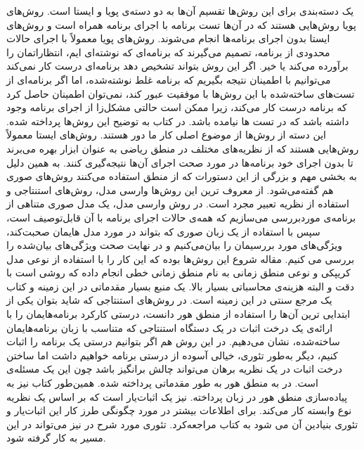 \documentclass[12pt]{report}
\begin{document}
یک دسته‌بندی برای این روش‌ها تقسیم آن‌ها به دو دسته‌ی پویا و ایستا است. روش‌های پویا روش‌هایی هستند که در آن‌ها تست برنامه با اجرای برنامه همراه است و روش‌های ایستا بدون اجرای برنامه‌ها انجام می‌شوند.
روش‌های پویا معمولاً با اجرای حالات محدودی از برنامه، تصمیم می‌گیرند که برنامه‌ای که نوشته‌ای ایم، انتظاراتمان را برآورده می‌کند یا خیر. اگر این روش بتواند تشخیص دهد برنامه‌ای درست کار نمی‌کند می‌توانیم با اطمینان نتیجه بگیریم که برنامه غلط نوشته‌شده، اما اگر برنامه‌ای از تست‌های ساخته‌شده با این روش‌ها با موفقیت عبور کند، نمی‌توان اطمینان حاصل کرد که برنامه درست کار می‌کند، زیرا ممکن است حالتی مشکل‌زا از اجرای برنامه وجود داشته باشد که در تست ها نیامده باشد. در  کتاب \cite{art}  به توضیح این روش‌ها پرداخته شده. این دسته از روش‌ها از موضوع اصلی کار ما دور هستند.
روش‌های ایستا معمولاً روش‌هایی هستند که از نظریه‌های مختلف در منطق ریاضی به عنوان ابزار بهره می‌برند تا بدون اجرای خود برنامه‌ها در مورد صحت اجرای آن‌ها نتیجه‌گیری کنند. به همین دلیل به بخشی مهم و بزرگی از این دستورات که از منطق استفاده می‌کنند روش‌های صوری هم گفته‌می‌شود. از معروف ترین این روش‌ها وارسی‌ مدل، روش‌های استنتاجی و استفاده از نظریه تعبیر مجرد است.
در روش وارسی مدل، یک مدل صوری متناهی از برنامه‌ی موردبررسی می‌سازیم که  همه‌ی حالات اجرای برنامه با آن قابل‌توصیف است، سپس با استفاده از یک زبان صوری که بتواند در مورد مدل هایمان صحبت‌کند، ویژگی‌های مورد بررسیمان را بیان‌می‌کنیم و در نهایت صحت ویژگی‌های بیان‌شده را بررسی می کنیم. مقاله \cite{clarke} شروع این روش‌ها بوده که این کار را با استفاده از نوعی مدل کریپکی  \cite{kripke} و نوعی منطق زمانی به نام منطق زمانی خطی \cite{clarke} انجام داده که روشی است با دقت و البته هزینه‌ی محاسباتی بسیار بالا. \cite{logicincs} یک منبع بسیار مقدماتی در این زمینه و کتاب\cite{clarke2} یک مرجع سنتی در این زمینه است.
در روش‌های استنتاجی که شاید بتوان یکی از ابتدایی ترین آن‌ها را استفاده از منطق هور\cite{hoare} دانست، درستی کارکرد برنامه‌هایمان را با ارائه‌ی یک درخت اثبات در یک دستگاه استنتاجی که متناسب با زبان برنامه‌هایمان ساخته‌شده، نشان می‌‌دهیم. در این روش هم اگر بتوانیم درستی یک برنامه را اثبات کنیم، دیگر به‌طور تئوری، خیالی آسوده از درستی برنامه خواهیم داشت اما ساختن درخت اثبات در یک نظریه برهان می‌تواند چالش بر‌انگیز باشد چون این یک مسئله‌ی  است. در\cite{logicincs} به منطق هور به طور مقدماتی پرداخته شده. همین‌طور کتاب\cite{softwarefoundations} نیز به پیاده‌سازی منطق هور در زبان  پرداخته.    نیز یک اثبات‌یار است که بر اساس یک نظریه نوع وابسته کار می‌کند. برای اطلاعات بیشتر در مورد چگونگی طرز کار این اثبات‌یار و تئوری بنیادین آن می شود به کتاب\cite{chlipala} مراجعه‌کرد. تئوری مورد شرح در\cite{dynamic} نیز می‌تواند در این مسیر به کار گرفته شود.
\end{document}
